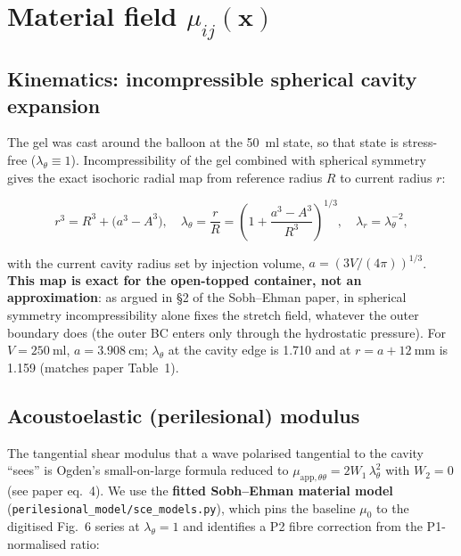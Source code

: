 \documentclass[11pt,letterpaper]{article}
\newcommand{\vect}[1]{\boldsymbol{#1}}
\begin{document}
\section{Material field $\mu_{ij}(\vect x)$}
\label{sec:material}

\subsection{Kinematics: incompressible spherical cavity expansion}

The gel was cast around the balloon at the \SI{50}{\milli\litre} state, so
that state is stress-free ($\lambda_\theta \equiv 1$). Incompressibility
of the gel combined with spherical symmetry gives the exact isochoric
radial map from reference radius $R$ to current radius $r$:

\begin{equation}
r^3 = R^3 + \bigl(a^3 - A^3\bigr),
\quad
\lambda_\theta = \frac{r}{R} = \left(1 + \frac{a^3 - A^3}{R^3}\right)^{1/3},
\quad
\lambda_r = \lambda_\theta^{-2},
\label{eq:kinematics}
\end{equation}

with the current cavity radius set by injection volume,
$a = (3V/(4\pi))^{1/3}$. \textbf{This map is exact for the open-topped
container, not an approximation}: as argued in \S2 of the Sobh--Ehman
paper, in spherical symmetry incompressibility alone fixes the
stretch field, whatever the outer boundary does (the outer BC enters
only through the hydrostatic pressure). For $V = \SI{250}{\milli\litre}$,
$a = \SI{3.908}{\centi\metre}$; $\lambda_\theta$ at the cavity edge is 1.710
and at $r = a + \SI{12}{\milli\metre}$ is 1.159 (matches paper Table~1).

\subsection{Acoustoelastic (perilesional) modulus}

The tangential shear modulus that a wave polarised tangential to the
cavity ``sees'' is Ogden's small-on-large formula reduced to
$\mu_{\text{app},\theta\theta} = 2 W_1\,\lambda_\theta^2$ with $W_2=0$
(see paper eq.\ 4). We use the \textbf{fitted Sobh--Ehman material
model} (\texttt{perilesional\_model/sce\_models.py}), which pins the
baseline $\mu_0$ to the digitised Fig.~6 series at $\lambda_\theta = 1$
and identifies a P2 fibre correction from the P1-normalised ratio:
\end{document}
